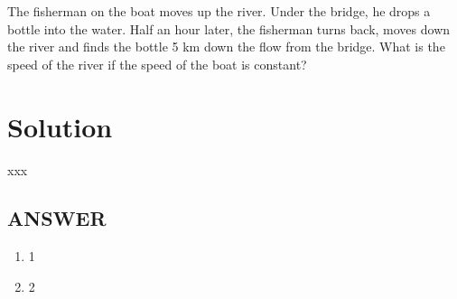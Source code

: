 The fisherman on the boat moves up the river. Under the bridge, he drops a bottle into the water.
Half an hour later, the fisherman turns back, moves down the river and finds the bottle 5 km
down the flow from the bridge. What is the speed of the river if the speed of the boat is constant?

\section*{Solution}

xxx

\vfill
\subsection*{ANSWER}
\begin{enumerate}
    \item 1
    \item 2
\end{enumerate}